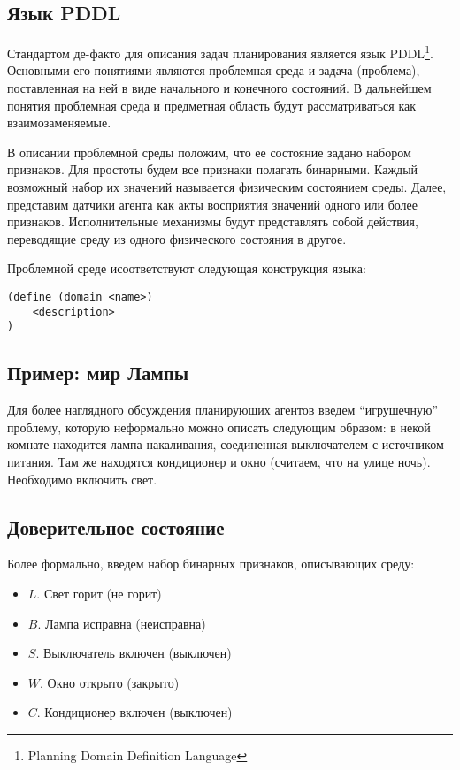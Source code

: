 \subsection{Язык PDDL}

Стандартом де-факто для описания задач планирования является язык
PDDL\footnote{Planning Domain Definition Language}. Основными его понятиями являются проблемная среда и задача (проблема), поставленная на ней в виде начального и конечного состояний. В дальнейшем понятия проблемная среда и предметная область будут рассматриваться как взаимозаменяемые.

В описании проблемной среды положим, что ее состояние задано набором
признаков. Для простоты будем все признаки полагать бинарными. Каждый
возможный набор их значений называется физическим состоянием среды.
Далее, представим датчики агента как акты восприятия значений одного или
более признаков. Исполнительные механизмы будут представлять собой
действия, переводящие среду из одного физического состояния в другое.

Проблемной среде исоответствуют следующая конструкция языка:

\begin{verbatim}
(define (domain <name>)
    <description>
)
\end{verbatim}

\subsection{Пример: мир Лампы}

Для более наглядного обсуждения планирующих агентов введем ``игрушечную'' проблему, которую неформально можно описать следующим образом: в некой
комнате находится лампа накаливания, соединенная выключателем с
источником питания. Там же находятся кондиционер и окно (считаем, что на
улице ночь). Необходимо включить свет.

\subsection{Доверительное состояние}

Более формально, введем набор бинарных признаков, описывающих среду:

\begin{itemize}
\item
  $L$. Свет горит (не горит)
\item
  $B$. Лампа исправна (неисправна)
\item
  $S$. Выключатель включен (выключен)
\item
  $W$. Окно открыто (закрыто)
\item
  $C$. Кондиционер включен (выключен)
\end{itemize}


